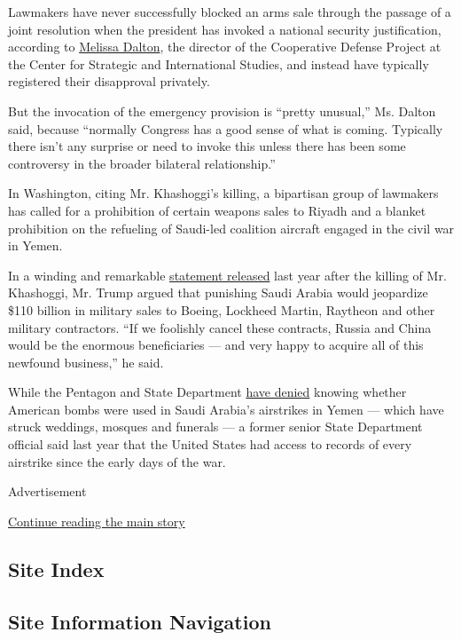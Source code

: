 Lawmakers have never successfully blocked an arms sale through the
passage of a joint resolution when the president has invoked a national
security justification, according to
\href{https://www.csis.org/people/melissa-dalton}{Melissa Dalton}, the
director of the Cooperative Defense Project at the Center for Strategic
and International Studies, and instead have typically registered their
disapproval privately.

But the invocation of the emergency provision is ``pretty unusual,'' Ms.
Dalton said, because ``normally Congress has a good sense of what is
coming. Typically there isn't any surprise or need to invoke this unless
there has been some controversy in the broader bilateral relationship.''

In Washington, citing Mr. Khashoggi's killing, a bipartisan group of
lawmakers has called for a prohibition of certain weapons sales to
Riyadh and a blanket prohibition on the refueling of Saudi-led coalition
aircraft engaged in the civil war in Yemen.

In a winding and remarkable
\href{https://www.whitehouse.gov/briefings-statements/statement-president-donald-j-trump-standing-saudi-arabia/}{statement
released} last year after the killing of Mr. Khashoggi, Mr. Trump argued
that punishing Saudi Arabia would jeopardize \$110 billion in military
sales to Boeing, Lockheed Martin, Raytheon and other military
contractors. ``If we foolishly cancel these contracts, Russia and China
would be the enormous beneficiaries --- and very happy to acquire all of
this newfound business,'' he said.

While the Pentagon and State Department
\href{https://www.vox.com/2018/8/9/17671386/yemen-airstrikes-saudi-arabia-coalition-pentagon}{have
denied} knowing whether American bombs were used in Saudi Arabia's
airstrikes in Yemen --- which have struck weddings, mosques and funerals
--- a former senior State Department official said last year that the
United States had access to records of every airstrike since the early
days of the war.

Advertisement

\protect\hyperlink{after-bottom}{Continue reading the main story}

\hypertarget{site-index}{%
\subsection{Site Index}\label{site-index}}

\hypertarget{site-information-navigation}{%
\subsection{Site Information
Navigation}\label{site-information-navigation}}

